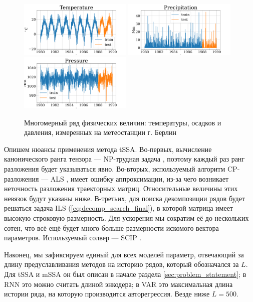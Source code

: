 			\begin{figure}[h]
				\centering
				\includegraphics[width=0.48\textwidth, keepaspectratio]{../figs/Temperature.png}
				\includegraphics[width=0.48\textwidth, keepaspectratio]{../figs/Precipitation.png}
				\includegraphics[width=0.48\textwidth, keepaspectratio]{../figs/Pressure.png}
				\caption{Многомерный ряд физических величин: температуры, осадков и давления, измеренных на метеостанции г. Берлин}\label{fig:weather_data}
			\end{figure}
			
			Опишем нюансы применения метода tSSA. Во-первых, вычисление канонического ранга тензора --- NP-трудная задача \cite{HASTAD1990644}, поэтому каждый раз ранг разложения будет указываться явно. Во-вторых, используемый алгоритм CP-разложения --- ALS \cite{kolda_tensors}, имеет ошибку аппроксимации, из-за чего возникает неточность разложения траекторных матриц. Относительные величины этих невязок будут указаны ниже. В-третьих, для поиска декомпозиции рядов будет решаться задача ILS (\ref{eq:decomp_search_final}), в которой матрица имеет высокую строковую размерность. Для ускорения мы сократим её до нескольких сотен, что всё ещё будет много больше размерности искомого вектора параметров. Используемый солвер --- SCIP \cite{BolusaniEtal2024ZR}.
			
			Наконец, мы зафиксируем единый для всех моделей параметр, отвечающий за длину предуславливания методов на историю рядов, который обозначался за $ L $. Для tSSA и mSSA он был описан в начале раздела \ref{sec:problem_statement}; в RNN это можно считать длиной энкодера; в VAR это максимальная длина истории ряда, на которую производится авторегрессия. Везде ниже $ L = 500 $.		
				
